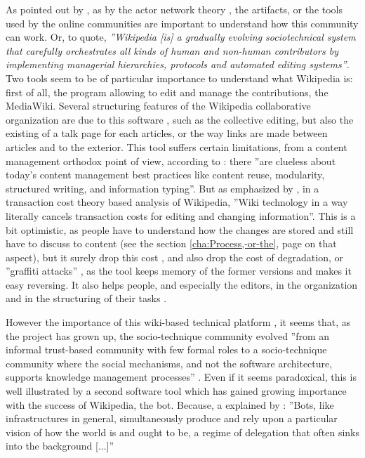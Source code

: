 As pointed out by \citet{HessOstrom06b}, as by the actor network
theory \citet{AkrichCallonLatour06,Latour05}, the artifacts, or the
tools used by the online communities are important to understand how
this community can work. Or, to quote\citet[p. 6]{NiederervanDijck10},
\textit{''Wikipedia {[}is{]} a gradually evolving sociotechnical
system that carefully orchestrates all kinds of human and non-human
contributors by implementing managerial hierarchies, protocols and
automated editing systems''}. Two tools seem to be of particular
importance to understand what Wikipedia is: first of all, the program
allowing to edit and manage the contributions, the MediaWiki. Several
structuring features of the Wikipedia collaborative organization are
due to this software \citep{PrasarnphanichWagner09}, such as the
collective editing, but also the existing of a talk page for each
articles, or the way links are made between articles and to the exterior.
This tool suffers certain limitations, from a content management orthodox
point of view, according to \citet{Doyle08}: there ''are clueless
about today\textquoteright s content management best practices like
content reuse, modularity, structured writing, and information typing''.
But as emphasized by \citet{Ciffolilli03}, in a transaction cost
theory based analysis of Wikipedia, ''Wiki technology in a way literally
cancels transaction costs for editing and changing information''.
This is a bit optimistic, as people have to understand how the changes
are stored and still have to discuss to content (see the section \ref{cha:Process,-or-the},
page \pageref{cha:Process,-or-the} on that aspect), but it surely
drop this cost \citep[p. 252]{RafaeliAriel08}, and also drop the
cost of degradation, or ''graffiti attacks'' \citep{Ciffolilli03},
as the tool keeps memory of the former versions and makes it easy
reversing. It also helps people, and especially the editors, in the
organization and in the structuring of their tasks \citep{Sundin11}.

However the importance of this wiki-based technical platform \citep{NiederervanDijck10},
it seems that, as the project has grown up, the socio-technique community
evolved ''from an informal trust-based community with few formal
roles to a socio-technique community where the social mechanisms,
and not the software architecture, supports knowledge management processes''
\citep{Jahnke10}. Even if it seems paradoxical, this is well illustrated
by a second software tool which has gained growing importance with
the success of Wikipedia, the bot. Because, a explained by \citet[end of p. 5 and following]{Geiger11}:
''Bots, like infrastructures in general, simultaneously produce and
rely upon a particular vision of how the world is and ought to be,
a regime of delegation that often sinks into the background {[}...{]}''

